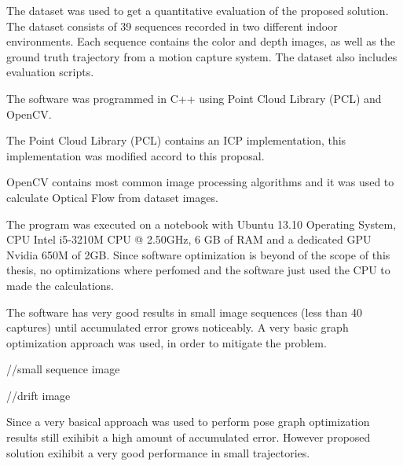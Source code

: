 The dataset \cite{sturm12iros} was used to get a quantitative evaluation 
of the proposed solution. The dataset consists of 39 sequences recorded in
two different indoor environments. Each sequence contains
the color and depth images, as well as the ground truth
trajectory from a motion capture system. The dataset also includes evaluation 
scripts.

The software was programmed in C++ using Point Cloud Library (PCL) and OpenCV.

The Point Cloud Library (PCL) contains an ICP implementation, this implementation 
was modified accord to this proposal.

OpenCV contains most common image processing algorithms and it was used to calculate 
Optical Flow from dataset images. 


The program was executed on a notebook with Ubuntu 13.10 Operating System, 
CPU Intel i5-3210M CPU @ 2.50GHz, 6 GB of RAM 
and a dedicated GPU Nvidia 650M of 2GB. Since software optimization is beyond of the scope 
of this thesis, no optimizations where perfomed and the software just used the CPU to 
made the calculations.



The software has very good results in small image sequences (less than 40 captures) until 
accumulated error grows noticeably. A very basic graph optimization approach was used, in 
order to mitigate the problem.

//small sequence image 


//drift image


Since a very basical approach was used to perform pose graph optimization results still 
exihibit a high amount of accumulated error. However proposed solution exihibit a very 
good performance in small trajectories.
